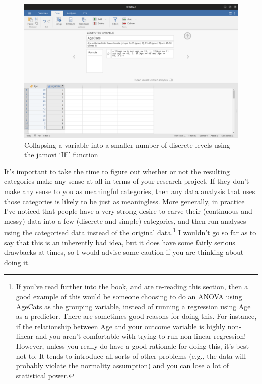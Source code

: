 \documentclass[
  a4paper,
]{book}
\begin{document}
\begin{figure}

\includegraphics[width=1\textwidth,height=\textheight]{images/fig6-6.png} \hfill{}

\caption{\label{fig-fig6-6}Collapsing a variable into a smaller number
of discrete levels using the jamovi `IF' function}

\end{figure}

It's important to take the time to figure out whether or not the
resulting categories make any sense at all in terms of your research
project. If they don't make any sense to you as meaningful categories,
then any data analysis that uses those categories is likely to be just
as meaningless. More generally, in practice I've noticed that people
have a very strong desire to carve their (continuous and messy) data
into a few (discrete and simple) categories, and then run analyses using
the categorised data instead of the original data.\footnote{If you've
  read further into the book, and are re-reading this section, then a
  good example of this would be someone choosing to do an ANOVA using
  AgeCats as the grouping variable, instead of running a regression
  using Age as a predictor. There are sometimes good reasons for doing
  this. For instance, if the relationship between Age and your outcome
  variable is highly non-linear and you aren't comfortable with trying
  to run non-linear regression! However, unless you really do have a
  good rationale for doing this, it's best not to. It tends to introduce
  all sorts of other problems (e.g., the data will probably violate the
  normality assumption) and you can lose a lot of statistical power.} I
wouldn't go so far as to say that this is an inherently bad idea, but it
does have some fairly serious drawbacks at times, so I would advise some
caution if you are thinking about doing it.
\end{document}
